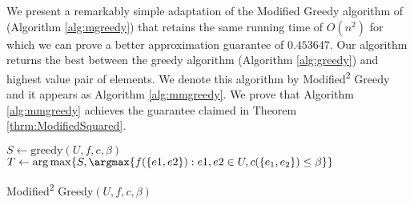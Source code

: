 We present a remarkably simple adaptation of the Modified Greedy algorithm of \cite{khuller1999budgeted} (Algorithm \ref{alg:mgreedy}) that retains the same running time of $O(n^2)$ for which we can prove a better approximation guarantee of $0.453647$.
Our algorithm returns the best between the greedy algorithm (Algorithm \ref{alg:greedy}) and highest value pair of elements.
We denote this algorithm by Modified\textsuperscript{2} Greedy and it appears as Algorithm \ref{alg:mmgreedy}.
We prove that Algorithm \ref{alg:mmgreedy} achieves the guarantee claimed in Theorem \ref{thrm:ModifiedSquared}.




\begin{algorithm}
	$S \leftarrow \text{greedy}(U, f, c, \beta)$
	\\
	$T \leftarrow \arg\max\{S, \argmax \{ f(\{ e1,e2\}):e1,e2\in U, c(\{e_1, e_2\} ) \leq \beta \} \}$
	\\
	\caption{Modified\textsuperscript{2} Greedy$(U, f, c, \beta)$}
	\label{alg:mmgreedy}
\end{algorithm}


